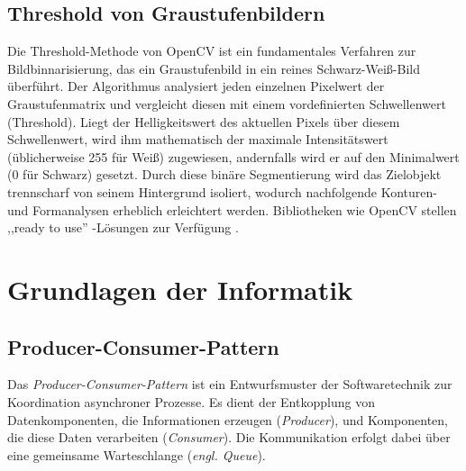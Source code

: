 \subsection{Threshold von Graustufenbildern}
Die Threshold-Methode von OpenCV ist ein fundamentales Verfahren zur Bildbinnarisierung, das ein Graustufenbild in ein reines Schwarz-Weiß-Bild überführt. Der Algorithmus analysiert jeden einzelnen Pixelwert der Graustufenmatrix und vergleicht diesen mit einem vordefinierten Schwellenwert (Threshold). Liegt der Helligkeitswert des aktuellen Pixels über diesem Schwellenwert, wird ihm mathematisch der maximale Intensitätswert (üblicherweise 255 für Weiß) zugewiesen, andernfalls wird er auf den Minimalwert (0 für Schwarz) gesetzt. Durch diese binäre Segmentierung wird das Zielobjekt trennscharf von seinem Hintergrund isoliert, wodurch nachfolgende Konturen- und Formanalysen erheblich erleichtert werden. Bibliotheken wie OpenCV stellen ,,ready to use'' -Lösungen zur Verfügung \cite{bradski2008}.

\section{Grundlagen der Informatik}
\label{kap:Grundlagen der Informatik}
\subsection{Producer-Consumer-Pattern}
\label{kap:Producer-Consumer-Pattern}
Das \textit{Producer-Consumer-Pattern} ist ein Entwurfsmuster der Softwaretechnik zur Koordination asynchroner Prozesse. Es dient der Entkopplung von Datenkomponenten, die Informationen erzeugen (\textit{Producer}), und Komponenten, die diese Daten verarbeiten (\textit{Consumer}). Die Kommunikation erfolgt dabei über eine gemeinsame Warteschlange (\textit{engl. Queue}).

